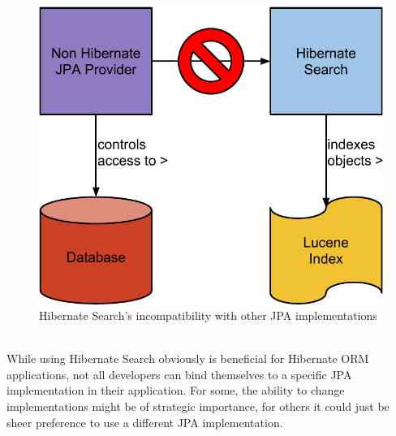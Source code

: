 \begin{figure}[ht]
	\centering
	\includegraphics[scale=0.45]{images/hibernate_search_any_jpa_problem_schema.pdf}
	\caption{Hibernate Search's incompatibility with other JPA implementations}
	\label{fig2}
\end{figure}
\\
While using Hibernate Search obviously is beneficial for Hibernate ORM applications, not all developers can bind themselves to a specific JPA implementation in their application. For some, the ability to change implementations might be of strategic importance, for others it could just be sheer preference to use a different JPA implementation.


